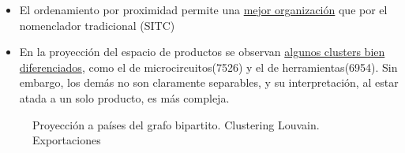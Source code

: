 \documentclass[compress]{beamer}
\begin{document}
\begin{frame}

\begin{itemize}[label=\faRebel]
	\item El ordenamiento por proximidad permite una \underline{mejor organización} que por el nomenclador tradicional (SITC\citep{WTO2017})
	\item En la proyección del espacio de productos se observan \underline{algunos clusters bien diferenciados}, como el de microcircuitos(7526) y el de herramientas(6954). Sin embargo, los demás no son claramente separables, y su interpretación, al estar atada a un solo producto, es más compleja.
	
\end{itemize}
\end{frame}


\begin{frame}
	\begin{figure}
		\centering
		\caption{Proyección a países del grafo bipartito. Clustering Louvain. Exportaciones}
		\label{fig:mapas_proyeccion_louvain}
	\end{figure}
\end{frame}
\end{document}

